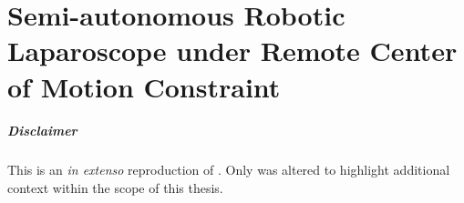 \graphicspath{{chapter_2}}
\chapter[Semi-autonomous Robotic Laparoscope]{Semi-autonomous Robotic Laparoscope under Remote Center of Motion Constraint}
\label{chap:robotic_endoscope}
\minitoc

\paragraph{Disclaimer} This  is an \textit{in extenso} reproduction of \cite{huber2021homographybased}. Only  was altered to highlight additional context within the scope of this thesis.






\newpage




